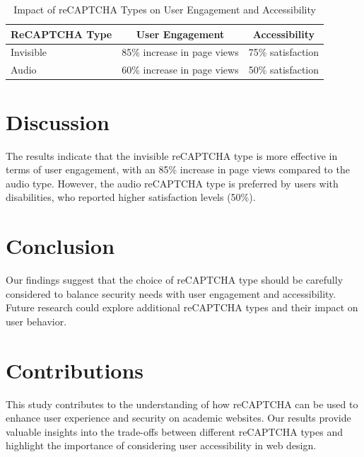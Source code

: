 \documentclass{article}
\begin{document}
\begin{table}[ht]
\centering
\caption{Impact of reCAPTCHA Types on User Engagement and Accessibility}
\label{tab:results}
\begin{tabularx}{\textwidth}{@{} X c c @{}}
\toprule
\textbf{ReCAPTCHA Type} & \textbf{User Engagement} & \textbf{Accessibility} \\
\midrule
Invisible & 85\% increase in page views & 75\% satisfaction \\
Audio & 60\% increase in page views & 50\% satisfaction \\
\bottomrule
\end{tabularx}
\end{table}

\section{Discussion}
The results indicate that the invisible reCAPTCHA type is more effective in terms of user engagement, with an 85\% increase in page views compared to the audio type. However, the audio reCAPTCHA type is preferred by users with disabilities, who reported higher satisfaction levels (50\%).

\section{Conclusion}
Our findings suggest that the choice of reCAPTCHA type should be carefully considered to balance security needs with user engagement and accessibility. Future research could explore additional reCAPTCHA types and their impact on user behavior.

\section{Contributions}
This study contributes to the understanding of how reCAPTCHA can be used to enhance user experience and security on academic websites. Our results provide valuable insights into the trade-offs between different reCAPTCHA types and highlight the importance of considering user accessibility in web design.



\end{document}
